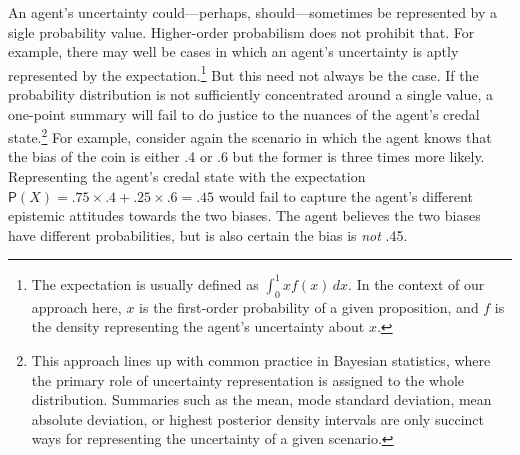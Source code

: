 \documentclass[
  letterpaper,
  DIV=11,
  numbers=noendperiod]{scrartcl}
\begin{document}
An agent's uncertainty could---perhaps, should---sometimes be
represented by a sigle probability value. Higher-order probabilism does
not prohibit that. For example, there may well be cases in which an
agent's uncertainty is aptly represented by the expectation.\footnote{The
  expectation is usually defined as \(\int_{0}^{1} x f(x) \, dx\). In
  the context of our approach here, \(x\) is the first-order probability
  of a given proposition, and \(f\) is the density representing the
  agent's uncertainty about \(x\).} But this need not always be the
case. If the probability distribution is not sufficiently concentrated
around a single value, a one-point summary will fail to do justice to
the nuances of the agent's credal state.\footnote{This approach lines up
  with common practice in Bayesian statistics, where the primary role of
  uncertainty representation is assigned to the whole distribution.
  Summaries such as the mean, mode standard deviation, mean absolute
  deviation, or highest posterior density intervals are only succinct
  ways for representing the uncertainty of a given scenario.} For
example, consider again the scenario in which the agent knows that the
bias of the coin is either .4 or .6 but the former is three times more
likely. Representing the agent's credal state with the expectation
\(\mathsf{P}(X) = .75 \times .4 + .25 \times .6 = .45\) would fail to
capture the agent's different epistemic attitudes towards the two
biases. The agent believes the two biases have different probabilities,
but is also certain the bias is \emph{not} .45.
\end{document}
